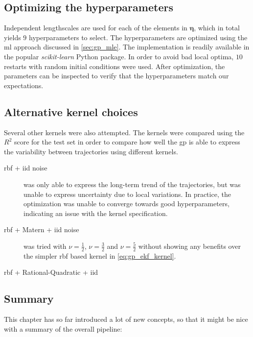\subsection{Optimizing the hyperparameters}
Independent lengthscales are used for each of the elements in $\boldsymbol{\eta}$, which in total yields $9$ hyperparameters to select. The hyperparameters are optimized using the \acrshort{ml} approach discussed in \cref{sec:gp_mle}. The implementation is readily available in the popular \textit{scikit-learn} \cite{scikit-learn} Python package. In order to avoid bad local optima, $10$ restarts with random initial conditions were used. After optimization, the parameters can be inspected to verify that the hyperparameters match our expectations.

\subsection{Alternative kernel choices}
Several other kernels were also attempted. The kernels were compared using the $R^2$ score for the test set in order to compare how well the \acrshort{gp} is able to express the variability between trajectories using different kernels.

\begin{description}
    \item[\acrshort{rbf} + \acrshort{iid} noise] was only able to express the long-term trend of the trajectories, but was unable to express uncertainty due to local variations. In practice, the optimization was unable to converge towards good hyperparameters, indicating an issue with the kernel specification.
    \item[\acrshort{rbf} + Matern + \acrshort{iid} noise] was tried with $\nu=\frac{1}{2}$, $\nu=\frac{3}{2}$ and $\nu=\frac{5}{2}$ without showing any benefits over the simpler \acrshort{rbf} based kernel in \cref{eq:gp_ekf_kernel}.
    \item[\acrshort{rbf} + Rational-Quadratic + \acrshort{iid}]
\end{description}


\subsection{Summary}
This chapter has so far introduced a lot of new concepts, so that it might be nice with a summary of the overall pipeline:


